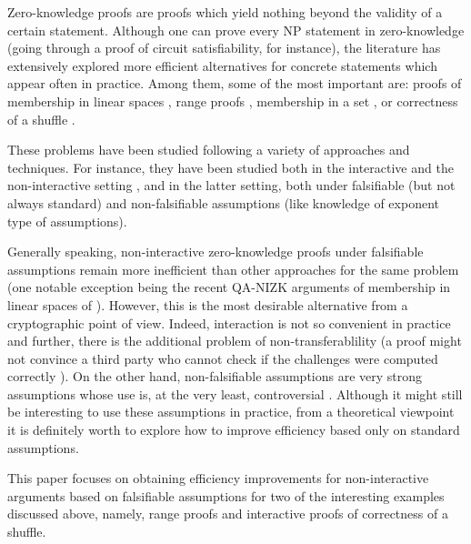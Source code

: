 Zero-knowledge proofs are proofs which yield nothing beyond the validity of a certain statement. Although one can prove every NP statement in zero-knowledge (going through a proof of circuit satisfiability, for instance),  the literature has extensively explored 
more efficient alternatives for concrete statements which appear often in practice. Among them, some of the most important are: proofs of membership in linear spaces \cite{AC:JutRoy13,EC:LPJY14,C:JutRoy14,EC:AbdBenPoi15,EC:KilWee15}, range proofs \cite{AC:CamChaShe08,PAIRING:RiaKohPre09,FC:ChaLipZha12}, membership in a set \cite{PAIRING:RiaKohPre09,EC:BayGro13}, or correctness of a shuffle \cite{Chaum81,AC:GroLu07,SCN:LipZha12,EPRINT:FauLip15}. 

These problems have been studied following a variety of approaches and techniques. For instance, they have been studied both in the interactive \cite{EC:BayGro12,AC:CamChaShe08,AC:Groth11} and the non-interactive setting \cite{PAIRING:RiaKohPre09,FC:ChaLipZha12,AC:GroLu07,SCN:LipZha12,EPRINT:FauLip15}, and in the latter setting, both under falsifiable (but not always standard) \cite{PAIRING:RiaKohPre09,AC:GroLu07} and non-falsifiable assumptions \cite{FC:ChaLipZha12,SCN:LipZha12,EPRINT:FauLip15} (like knowledge of exponent type of assumptions). 

Generally speaking, non-interactive zero-knowledge proofs under falsifiable assumptions remain more inefficient than other approaches for the same problem (one notable exception being the recent QA-NIZK arguments of membership in linear spaces of  \cite{EC:LPJY14,C:JutRoy14,EC:KilWee15}). However, this is the most desirable alternative from a cryptographic point of view. Indeed, interaction is not  so convenient in practice and further, there is the additional problem of non-transferablility (a proof might not convince a third party who cannot check if the challenges were computed correctly \cite{C:Pass03}).  On the other hand, non-falsifiable assumptions are very strong assumptions whose use is, at the very least, controversial \cite{EPRINT:BCPR13a,AC:BoyPas15}. Although it might still be interesting to use these assumptions in practice, from a theoretical viewpoint it is definitely worth to explore how to improve efficiency based only on standard assumptions.  

This paper focuses on obtaining efficiency improvements for non-interactive arguments based on falsifiable assumptions for two of the interesting examples discussed above, namely, range proofs and interactive proofs of correctness of a shuffle.  

